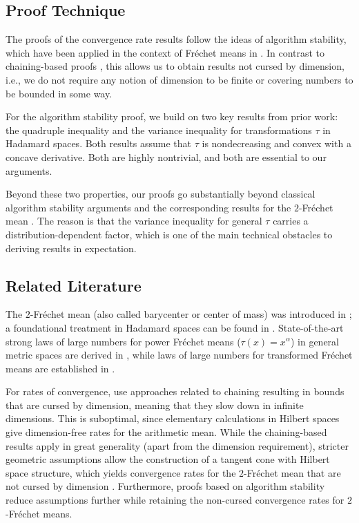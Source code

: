 \documentclass{article}
\newcommand{\tran}{\tau}
\begin{document}
\subsection{Proof Technique}
%
The proofs of the convergence rate results follow the ideas of algorithm stability, which have been applied in the context of Fr\'echet means in \cite{Escande2024,brunel2025}. In contrast to chaining-based proofs \cite{schoetz19,Ahidar2020}, this allows us to obtain results not cursed by dimension, i.e., we do not require any notion of dimension to be finite or covering numbers to be bounded in some way.

For the algorithm stability proof, we build on two key results from prior work: the quadruple inequality \cite{quadruple} and the variance inequality \cite{varinequ} for transformations $\tran$ in Hadamard spaces. Both results assume that $\tran$ is nondecreasing and convex with a concave derivative. Both are highly nontrivial, and both are essential to our arguments.

Beyond these two properties, our proofs go substantially beyond classical algorithm stability arguments and the corresponding results for the $2$-Fr\'echet mean \cite{Escande2024,brunel2025}. The reason is that the variance inequality for general $\tran$ carries a distribution-dependent factor, which is one of the main technical obstacles to deriving results in expectation.
%
%
%
\subsection{Related Literature}
%
The $2$-Fr\'echet mean (also called barycenter or center of mass) was introduced in \cite{frechet48}; a foundational treatment in Hadamard spaces can be found in \cite{sturm03}.
State-of-the-art strong laws of large numbers for power Fr\'echet means ($\tran(x)=x^\alpha$) in general metric spaces are derived in \cite{jaffe2024}, while laws of large numbers for transformed Fr\'echet means are established in \cite{schoetz22}.

For rates of convergence, \cite{Petersen2019,schoetz19,Ahidar2020} use approaches related to chaining \cite{talagrand21} resulting in bounds that are cursed by dimension, meaning that they slow down in infinite dimensions. This is suboptimal, since elementary calculations in Hilbert spaces give dimension-free rates for the arithmetic mean. While the chaining-based results apply in great generality (apart from the dimension requirement), stricter geometric assumptions allow the construction of a tangent cone with Hilbert space structure, which yields convergence rates for the $2$-Fr\'echet mean that are not cursed by dimension \cite{LeGouic2023}. Furthermore, proofs based on algorithm stability \cite{Escande2024,brunel2025} reduce assumptions further while retaining the non-cursed convergence rates for $2$-Fr\'echet means.
\end{document}
